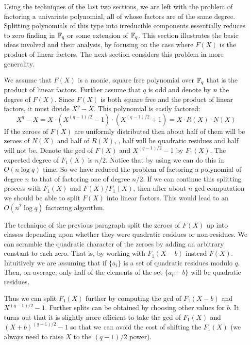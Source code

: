 Using the techniques of the last two sections, we are left with the
problem of factoring a univariate polynomial, all of whose factors are
of the same degree.  Splitting polynomials of this type into
irreducible components essentially reduces to zero finding in $\mathbb{F}_q$
or some extension of $\mathbb{F}_q$.  This section illustrates the basic ideas
involved and their analysis, by focusing on the case where $F(X)$ is
the product of linear factors.  The next section considers this
problem in more generality.

We assume that $F(X)$ is a monic, square free polynomial over $\mathbb{F}_q$
that is the product of linear factors.  Further assume that $q$ is
odd and denote by $n$ the degree of $F(X)$.  Since $F(X)$ is both square
free and the product of linear factors, it must divide $X^q - X$.  This
polynomial is easily factored:
\[
X^q - X = X\cdot (X^{(q-1)/2} - 1)\cdot (X^{(q-1)/2} + 1) 
  = X \cdot R(X) \cdot N(X)
\]
If the zeroes of $F(X)$ are uniformly distributed then about half of
them will be zeroes of $N(X)$ and half of $R(X)$, \ie, half will be
quadratic residues and half will not be.  Denote the {\sc gcd} of
$F(X)$ and $X^{(q-1)/2} - 1$ by $F_1(X)$.  The expected degree of
$F_1(X)$ is $n/2$.  Notice that by using  we can do
this in $O(n \log q)$ time.  So we have reduced the problem of
factoring a polynomial of degree $n$ to that of factoring one of
degree $n/2$.  If we can continue this splitting process with $F_1(X)$
and $F(X)/F_1(X)$, then after about $n$ {\sc gcd} computation we
should be able to split $F(X)$ into linear factors.  This would lead
to an $O(n^2 \log q)$ factoring algorithm. 

The technique of the previous paragraph split the zeroes of $F(X)$ up
into classes depending upon whether they were quadratic residues or
non-residues.  We can scramble the quadratic character of the zeroes
by adding an arbitrary constant to each zero.  That is, by working
with $F_1(X-b)$ instead $F(X)$.  Intuitively we are assuming that if
$\{ a_i \}$ is a set of quadratic residues modulo $q$.  Then, on
average, only half of the elements of the set $\{ a_i + b\}$ will be
quadratic residues.

Thus we can split $F_1(X)$ further by computing the {\sc gcd} of $F_1(X- b)$
and $X^{(q-1)/2} - 1$.  Further splits can be obtained by choosing
other values for $b$.  It turns out that it is slightly more efficient
to take the {\sc gcd} of $F_1(X)$ and $(X+b)^{(q-1)/2} - 1$ so that we can
avoid the cost of shifting the $F_1(X)$ (we always need to raise $X$
to the $(q-1)/2$ power).

